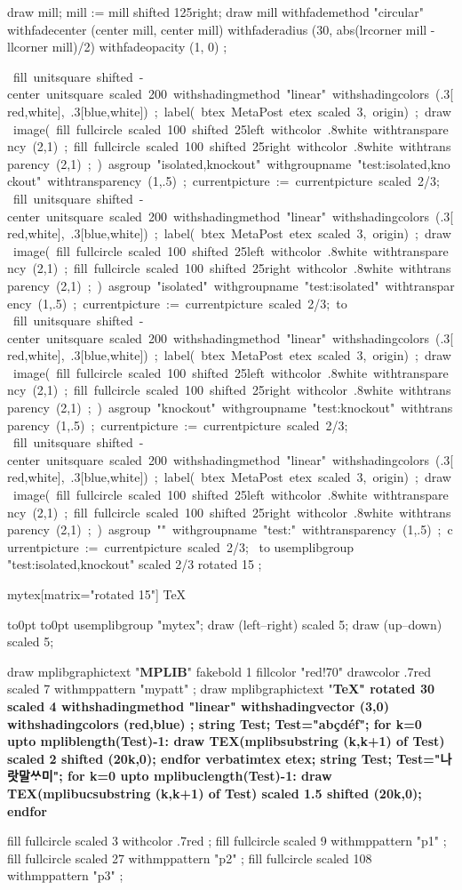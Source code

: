 \documentclass{article}
\begin{document}
  draw mill;
  mill := mill shifted 125right;
  draw mill
    withfademethod "circular"
    withfadecenter (center mill, center mill)
    withfaderadius (30, abs(lrcorner mill - llcorner mill)/2)
    withfadeopacity (1, 0)
    ;
\endmpfig
\par
\def\test#1{%
  \mpfig
  fill unitsquare shifted -center unitsquare scaled 200
    withshadingmethod "linear"
    withshadingcolors (.3[red,white], .3[blue,white])
    ;
  label( btex MetaPost etex scaled 3, origin) ;
  draw image(
    fill fullcircle scaled 100 shifted 25left
      withcolor .8white
      withtransparency (2,1)
      ;
    fill fullcircle scaled 100 shifted 25right
      withcolor .8white
      withtransparency (2,1)
      ;
  )
  asgroup "#1"
  withgroupname "test:#1"
  withtransparency (1,.5)
  ;
  currentpicture := currentpicture scaled 2/3;
  \endmpfig
}%
\hbox{\test{isolated,knockout}\,\test{isolated}\vbox to}%
\hbox{\test{knockout}\,\test{}}%
\hbox to%
\leavevmode
\mpfig usemplibgroup "test:isolated,knockout" scaled 2/3 rotated 15 ; \endmpfig
{}%
\begin{mplibgroup}{mytex}[matrix="rotated 15"] \TeX \end{mplibgroup}%
\hbox to0pt{\hss\vrule width.5pt height5pt depth5pt\hss}%
\hbox to0pt{\hss\vrule width10pt height.25pt depth.25pt\hss}%
%
\mpfig usemplibgroup "mytex"; draw (left--right) scaled 5; draw (up--down) scaled 5; \endmpfig
\par
\mpfig
  draw mplibgraphictext "\textbf{MPLIB}"
    fakebold 1 fillcolor "red!70" drawcolor .7red scaled 7
    withmppattern "mypatt" ;
\endmpfig
\mpfig
  draw mplibgraphictext "\bfseries\TeX" rotated 30 scaled 4
    withshadingmethod "linear"
    withshadingvector (3,0)
    withshadingcolors (red,blue)
    ;
\endmpfig
\leavevmode
\mpfig
  string Test; Test="abçdéf";
  for k=0 upto mpliblength(Test)-1:
    draw TEX(mplibsubstring (k,k+1) of Test) scaled 2 shifted (20k,0);
  endfor
\endmpfig
\qquad
{}%
\mpfig
  verbatimtex \hangulfont etex;
  string Test; Test="나랏말ᄊᆞ미";
  for k=0 upto mplibuclength(Test)-1:
    draw TEX(mplibucsubstring (k,k+1) of Test) scaled 1.5 shifted (20k,0);
  endfor
\endmpfig
\par
{}
  \mpfig
    fill fullcircle scaled 3
    withcolor .7red
    ;
  \endmpfig
\endmppattern
{}
  \mpfig
    fill fullcircle scaled 9
    withmppattern "p1"
    ;
  \endmpfig
\endmppattern
{}
  \mpfig
    fill fullcircle scaled 27
    withmppattern "p2"
    ;
  \endmpfig
\endmppattern
\mpfig
  fill fullcircle scaled 108
  withmppattern "p3"
  ;
\endmpfig
{}%
\end{document}
